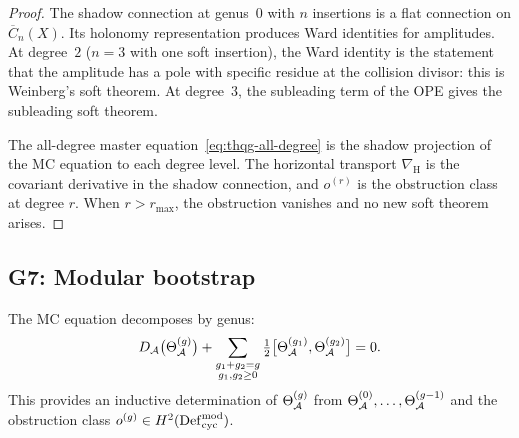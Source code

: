 \begin{proof}
The shadow connection at genus~$0$ with $n$ insertions is a
flat connection on $\overline{C}_n(X)$. Its holonomy
representation produces Ward identities for amplitudes. At
degree~$2$ ($n=3$ with one soft insertion), the Ward identity is
the statement that the amplitude has a pole with specific residue
at the collision divisor: this is Weinberg's soft theorem. At
degree~$3$, the subleading term of the OPE gives the subleading
soft theorem.

The all-degree master equation~\eqref{eq:thqg-all-degree} is the
shadow projection of the MC equation to each degree level. The
horizontal transport $\nabla_{\mathrm{H}}$ is the covariant
derivative in the shadow connection, and $o^{(r)}$ is the
obstruction class at degree $r$. When $r > r_{\max}$, the
obstruction vanishes and no new soft theorem arises.
\end{proof}


\subsection{G7: Modular bootstrap}

\begin{theorem}
The MC equation decomposes by genus:
\begin{equation}%
D_\cA\bigl(\Theta_\cA^{(g)}\bigr) +
\sum_{\substack{g_1 + g_2 = g \\ g_1, g_2 \ge 0}}
\tfrac{1}{2}\bigl[\Theta_\cA^{(g_1)}, \Theta_\cA^{(g_2)}\bigr] = 0.
\end{equation}
This provides an inductive determination of $\Theta_{\mathcal{A}}^{(g)}$ from
$\Theta_{\mathcal{A}}^{(0)}, \ldots, \Theta_{\mathcal{A}}^{(g-1)}$ and the obstruction class
$o^{(g)} \in H^2(\mathrm{Def}_{\mathrm{cyc}}^{\mathrm{mod}})$.
\end{theorem}

